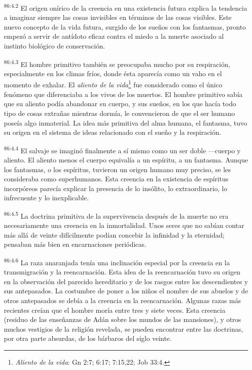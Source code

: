 \par
\textsuperscript{86:4.2} El origen onírico de la creencia en una existencia futura explica la tendencia a imaginar siempre las cosas invisibles en términos de las cosas visibles. Este nuevo concepto de la vida futura, surgido de los sueños con los fantasmas, pronto empezó a servir de antídoto eficaz contra el miedo a la muerte asociado al instinto biológico de conservación.

\par
\textsuperscript{86:4.3} El hombre primitivo también se preocupaba mucho por su respiración, especialmente en los climas fríos, donde ésta aparecía como un vaho en el momento de exhalar. El \textit{aliento de la vida}\footnote{\textit{Aliento de la vida}: Gn 2:7; 6:17; 7:15,22; Job 33:4.} fue considerado como el único fenómeno que diferenciaba a los vivos de los muertos. El hombre primitivo sabía que su aliento podía abandonar su cuerpo, y sus sueños, en los que hacía todo tipo de cosas extrañas mientras dormía, le convencieron de que el ser humano poseía algo inmaterial. La idea más primitiva del alma humana, el fantasma, tuvo su origen en el sistema de ideas relacionado con el sueño y la respiración.

\par
\textsuperscript{86:4.4} El salvaje se imaginó finalmente a sí mismo como un ser doble ---cuerpo y aliento. El aliento menos el cuerpo equivalía a un espíritu, a un fantasma. Aunque los fantasmas, o los espíritus, tuvieron un origen humano muy preciso, se les consideraba como superhumanos. Esta creencia en la existencia de espíritus incorpóreos parecía explicar la presencia de lo insólito, lo extraordinario, lo infrecuente y lo inexplicable.

\par
\textsuperscript{86:4.5} La doctrina primitiva de la supervivencia después de la muerte no era necesariamente una creencia en la inmortalidad. Unos seres que no sabían contar más allá de veinte difícilmente podían concebir la infinidad y la eternidad; pensaban más bien en encarnaciones periódicas.

\par
\textsuperscript{86:4.6} La raza anaranjada tenía una inclinación especial por la creencia en la transmigración y la reencarnación. Esta idea de la reencarnación tuvo su origen en la observación del parecido hereditario y de los rasgos entre los descendientes y sus antepasados. La costumbre de poner a los niños el nombre de sus abuelos y de otros antepasados se debía a la creencia en la reencarnación. Algunas razas más recientes creían que el hombre moría entre tres y siete veces. Esta creencia (residuo de las enseñanzas de Adán sobre los mundos de las mansiones), y otros muchos vestigios de la religión revelada, se pueden encontrar entre las doctrinas, por otra parte absurdas, de los bárbaros del siglo veinte.

